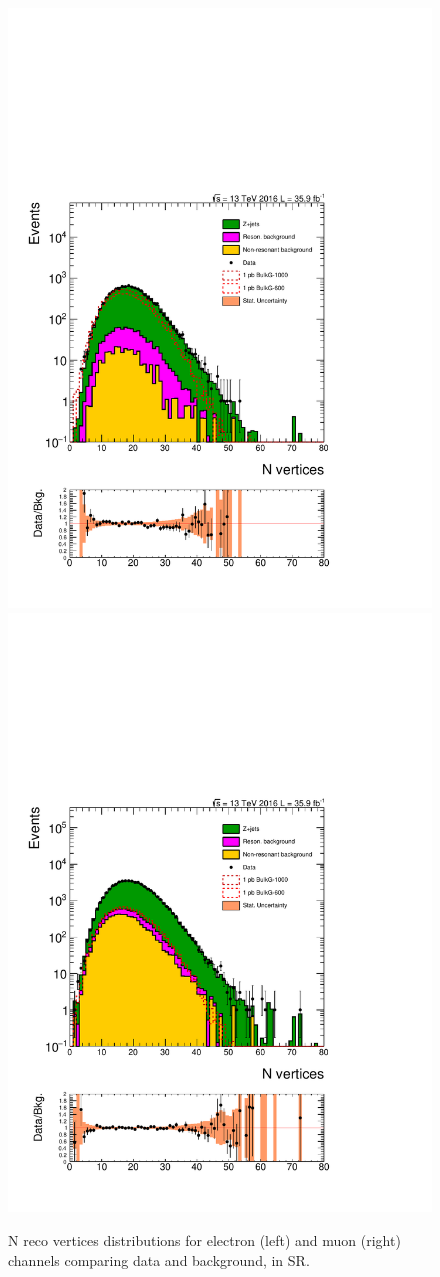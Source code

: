\begin{figure}[htbp!]
\centering
\includegraphics[width=0.46\linewidth, page=2]{figures/ReMiniSummer16_DT_PhReMiniMCRcFixXsec_GMCPhPtWt_SRdPhiGT0p5_puWeightsummer16_muoneg_gjet_metfilter_unblind_el_log_1pb.pdf}
\includegraphics[width=0.46\linewidth, page=2]{figures/ReMiniSummer16_DT_PhReMiniMCRcFixXsec_GMCPhPtWt_SRdPhiGT0p5_puWeightsummer16_muoneg_gjet_metfilter_unblind_mu_log_1pb.pdf}
\caption{N reco vertices distributions for electron (left) and muon (right)
channels comparing data and background, in SR.}
\label{fig:SR_gjet_nvtx}
\end{figure}


